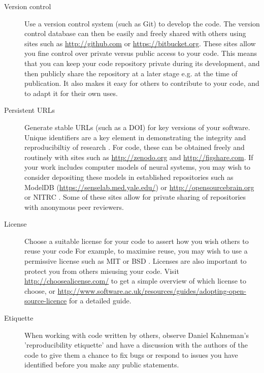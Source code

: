 \documentclass[11pt]{article}
\begin{document}
\begin{description}
\item [Version control] Use a version control system (such as Git) to
  develop the code.  The version control database can then be easily
  and freely shared with others using sites such as
  \url{http://github.com} \cite{Ram2013} or
  \url{https://bitbucket.org}.  These sites allow you fine control
  over private versus public access to your code.  This means that you
  can keep your code repository private during its development, and
  then publicly share the repository at a later stage e.g. at the time
  of publication. It also makes it easy for others to contribute to your code, and to adapt it for their own uses. 

\item [Persistent URLs] Generate stable URLs (such as a DOI) for key
  versions of your software.  Unique identifiers are a key element in demonstrating the integrity and reproducibiltiy of research \cite{vasilevsky2013reproducibility}. For code, these can be obtained freely and routinely with sites such as \url{http://zenodo.org} and \url{http://figshare.com}.  If your work includes computer models of neural systems, you may wish to consider depositing these models in established repositories such as ModelDB (\url{https://senselab.med.yale.edu/}) or \url{http://opensourcebrain.org} or NITRC \cite{poline_software_2014}. Some of these sites allow for private sharing of repositories with anonymous peer reviewers.


\item [License] Choose a suitable license for your code to assert how
  you wish others to reuse your code  For example, to maximise reuse,
  you may wish to use a permissive license such as MIT or BSD
  \cite{Stodden2009}.  Licenses are also important to protect you from
  others misusing your code.  Visit \url{http://choosealicense.com/}
  to get a simple overview of which license to choose, or 
  \url{http://www.software.ac.uk/resources/guides/adopting-open-source-licence}
  for a detailed guide.

\item [Etiquette] When working with code written by others, observe Daniel Kahneman's  'reproducibility etiquette'\cite{Kahneman2014} and have a discussion with the authors of the code to give them a chance to fix bugs or respond to issues you have identified before you make any public statements. 


\end{description}
\end{document}
